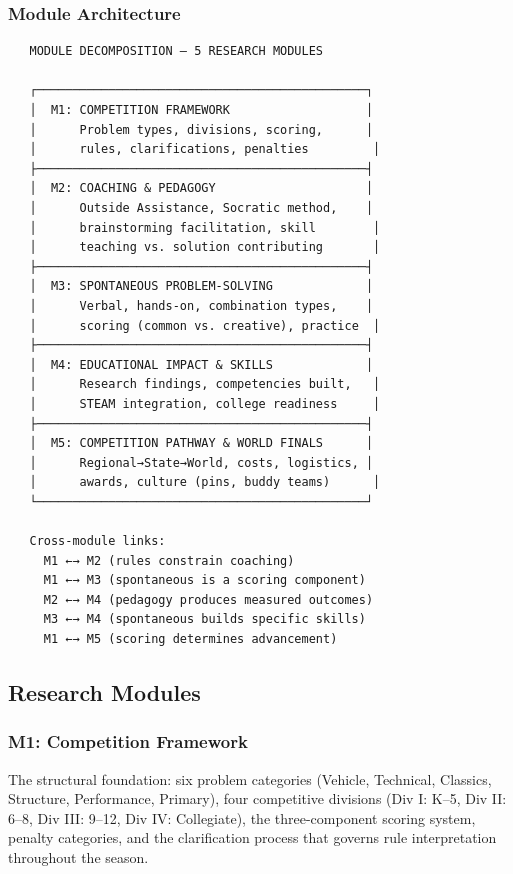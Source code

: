 \documentclass[11pt,letterpaper]{article}
\begin{document}
\subsubsection{Module Architecture}

\begin{asciibox}
\begin{verbatim}
   MODULE DECOMPOSITION — 5 RESEARCH MODULES

   ┌──────────────────────────────────────────────┐
   │  M1: COMPETITION FRAMEWORK                   │
   │      Problem types, divisions, scoring,      │
   │      rules, clarifications, penalties         │
   ├──────────────────────────────────────────────┤
   │  M2: COACHING & PEDAGOGY                     │
   │      Outside Assistance, Socratic method,    │
   │      brainstorming facilitation, skill        │
   │      teaching vs. solution contributing       │
   ├──────────────────────────────────────────────┤
   │  M3: SPONTANEOUS PROBLEM-SOLVING             │
   │      Verbal, hands-on, combination types,    │
   │      scoring (common vs. creative), practice  │
   ├──────────────────────────────────────────────┤
   │  M4: EDUCATIONAL IMPACT & SKILLS             │
   │      Research findings, competencies built,   │
   │      STEAM integration, college readiness     │
   ├──────────────────────────────────────────────┤
   │  M5: COMPETITION PATHWAY & WORLD FINALS      │
   │      Regional→State→World, costs, logistics, │
   │      awards, culture (pins, buddy teams)      │
   └──────────────────────────────────────────────┘

   Cross-module links:
     M1 ←→ M2 (rules constrain coaching)
     M1 ←→ M3 (spontaneous is a scoring component)
     M2 ←→ M4 (pedagogy produces measured outcomes)
     M3 ←→ M4 (spontaneous builds specific skills)
     M1 ←→ M5 (scoring determines advancement)
\end{verbatim}
\end{asciibox}

\subsection{Research Modules}

\subsubsection{M1: Competition Framework}
The structural foundation: six problem categories (Vehicle, Technical, Classics, Structure, Performance, Primary), four competitive divisions (Div I: K--5, Div II: 6--8, Div III: 9--12, Div IV: Collegiate), the three-component scoring system, penalty categories, and the clarification process that governs rule interpretation throughout the season.
\end{document}
